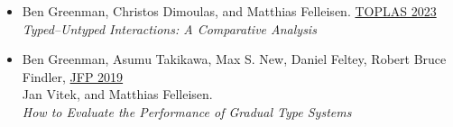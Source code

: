 \documentclass[11pt]{article}
\begin{document}


% 



\begin{itemize}
\item
  Ben Greenman, Christos Dimoulas, and Matthias Felleisen. \hfill \href{https://dl.acm.org/doi/10.1145/3579833}{TOPLAS 2023} \\
  \emph{Typed--Untyped Interactions: A Comparative Analysis}
\item
  Ben Greenman, Asumu Takikawa, Max S. New, Daniel Feltey, Robert Bruce Findler, \hfill \href{https://www.cambridge.org/core/journals/journal-of-functional-programming/article/abs/how-to-evaluate-the-performance-of-gradual-type-systems/DC765724C52A3A462F16C7FB3AD18697}{JFP 2019} \\
  Jan Vitek, and Matthias Felleisen. \\
  \emph{How to Evaluate the Performance of Gradual Type Systems}
\end{itemize}
\end{document}
